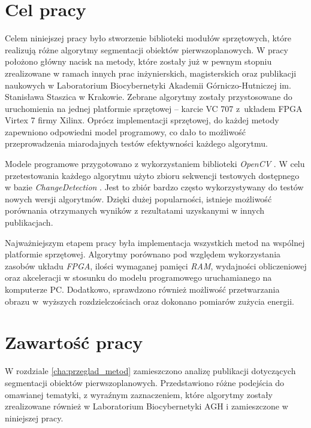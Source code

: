 \section{Cel pracy}
\label{sec:wprowadzenie_cel_pracy}

Celem niniejszej pracy było stworzenie biblioteki modułów sprzętowych, które realizują różne algorytmy segmentacji obiektów pierwszoplanowych. 
W pracy położono główny nacisk na metody, które zostały już w pewnym stopniu zrealizowane w ramach innych prac inżynierskich, magisterskich oraz publikacji naukowych w Laboratorium Biocybernetyki Akademii Górniczo-Hutniczej im. Stanisława Staszica w Krakowie.
Zebrane algorytmy zostały przystosowane do uruchomienia na jednej platformie sprzętowej -- karcie VC 707 z~układem FPGA Virtex 7 firmy Xilinx.
Oprócz implementacji sprzętowej, do każdej metody zapewniono odpowiedni model programowy, co dało to możliwość przeprowadzenia miarodajnych testów efektywności każdego algorytmu.

Modele programowe przygotowano z wykorzystaniem biblioteki \textit{OpenCV} \cite{opencv_17}. 
W celu przetestowania każdego algorytmu użyto zbioru sekwencji testowych dostępnego w bazie \textit{ChangeDetection} \cite{change_detection_web}. 
Jest to zbiór bardzo często wykorzystywany do testów nowych wersji algorytmów. 
Dzięki dużej popularności, istnieje możliwość porównania otrzymanych wyników z rezultatami uzyskanymi w innych publikacjach. 

Najważniejszym etapem pracy była implementacja wszystkich metod na wspólnej platformie sprzętowej. 
Algorytmy porównano pod względem wykorzystania zasobów układu \textit{FPGA}, ilości wymaganej pamięci \textit{RAM}, wydajności obliczeniowej oraz akceleracji w stosunku do modelu programowego uruchamianego na komputerze PC. 
Dodatkowo, sprawdzono również możliwość przetwarzania obrazu w~wyższych rozdzielczościach oraz dokonano pomiarów zużycia energii.

\section{Zawartość pracy}
\label{sec:wprowadzenie_zawartosc_pracy}

W rozdziale \ref{cha:przeglad_metod} zamieszczono analizę publikacji dotyczących segmentacji obiektów pierwszoplanowych. 
Przedstawiono różne podejścia do omawianej tematyki, z wyraźnym zaznaczeniem, które algorytmy zostały zrealizowane również w Laboratorium Biocybernetyki AGH i zamieszczone w niniejszej pracy.

